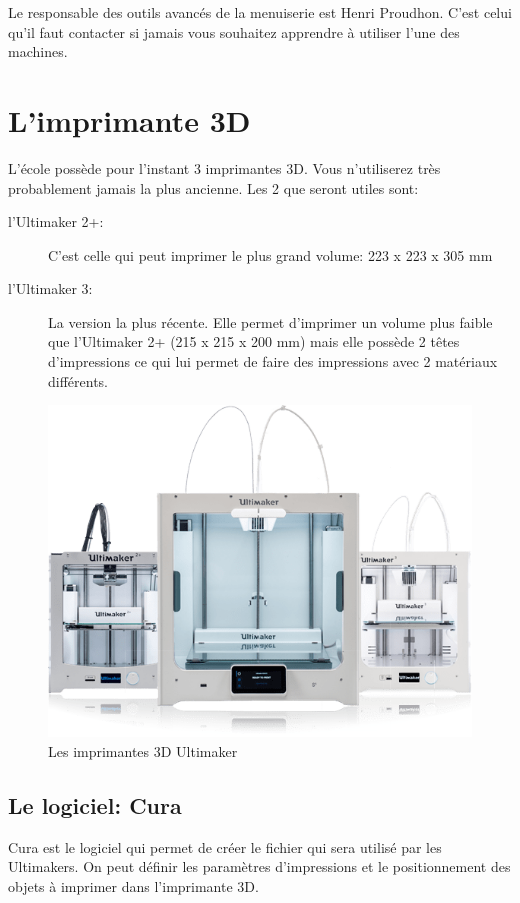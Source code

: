 \documentclass[a4paper, 11pt]{report}
\begin{document}
Le responsable des outils avancés de la menuiserie est Henri Proudhon. C'est celui qu'il faut contacter si jamais vous souhaitez apprendre à utiliser l'une des machines.

\section{L'imprimante 3D}
L'école possède pour l'instant 3 imprimantes 3D. Vous n'utiliserez très probablement jamais la plus ancienne. Les 2 que seront utiles sont:
\begin{description}
\item[l'Ultimaker 2+:]C'est celle qui peut imprimer le plus grand volume: 223 x 223 x 305 mm
\item[l'Ultimaker 3:]La version la plus récente. Elle permet d'imprimer un volume plus faible que l'Ultimaker 2+ (215 x 215 x 200 mm) mais elle possède 2 têtes d'impressions ce qui lui permet de faire des impressions avec 2 matériaux différents.
\end{description}

\begin{figure}[h!]
	\begin{center}
		\includegraphics[scale=0.6]{images/ultimaker.png}
		\caption{Les imprimantes 3D Ultimaker}
	\end{center}
\end{figure}

\subsection{Le logiciel: Cura}
Cura est le logiciel qui permet de créer le fichier qui sera utilisé par les Ultimakers. On peut définir les paramètres d'impressions et le positionnement des objets à imprimer dans l'imprimante 3D. 
\end{document}
